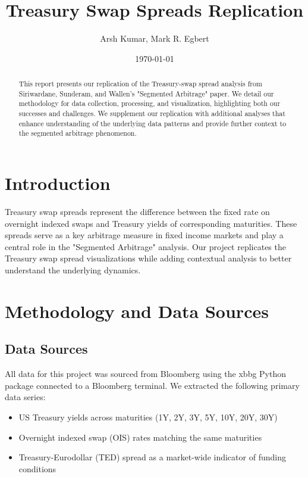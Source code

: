 \documentclass[12pt]{article}
\title{Treasury Swap Spreads Replication}
\author{Arsh Kumar, Mark R. Egbert}
\date{\today}
\begin{document}
\maketitle

\begin{abstract}
This report presents our replication of the Treasury-swap spread analysis from Siriwardane, Sunderam, and Wallen's "Segmented Arbitrage" paper. We detail our methodology for data collection, processing, and visualization, highlighting both our successes and challenges. We supplement our replication with additional analyses that enhance understanding of the underlying data patterns and provide further context to the segmented arbitrage phenomenon.
\end{abstract}

\section{Introduction}

Treasury swap spreads represent the difference between the fixed rate on overnight indexed swaps and Treasury yields of corresponding maturities. These spreads serve as a key arbitrage measure in fixed income markets and play a central role in the "Segmented Arbitrage" analysis. Our project replicates the Treasury swap spread visualizations while adding contextual analysis to better understand the underlying dynamics.

\section{Methodology and Data Sources}

\subsection{Data Sources}

All data for this project was sourced from Bloomberg using the xbbg Python package connected to a Bloomberg terminal. We extracted the following primary data series:

\begin{itemize}
    \item US Treasury yields across maturities (1Y, 2Y, 3Y, 5Y, 10Y, 20Y, 30Y)
    \item Overnight indexed swap (OIS) rates matching the same maturities
    \item Treasury-Eurodollar (TED) spread as a market-wide indicator of funding conditions
\end{itemize}
\end{document}
